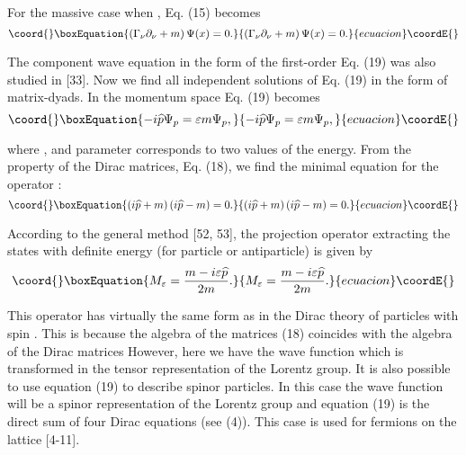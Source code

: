 \documentclass[a4paper,12pt]{article}
\begin{document}
For the massive case when \coordHE{}, Eq. (15) becomes
\begin{equation}\coord{}\boxEquation{
\left( \Gamma _\nu \partial _\nu +m\right) \Psi (x)=0 .\label{19}
}{
\left( \Gamma _\nu \partial _\nu +m\right) \Psi (x)=0 .}{ecuacion}\coordE{}\end{equation}

The \coordHE{}component wave equation in the form of the first-order Eq. (19) was
also studied in [33]. Now we find all independent solutions of Eq. (19) in
the form of matrix-dyads. In the momentum space Eq. (19) becomes
\begin{equation}\coord{}\boxEquation{
-i\widehat{p}\Psi _p=\varepsilon m\Psi _p , \label{20}
}{
-i\widehat{p}\Psi _p=\varepsilon m\Psi _p , }{ecuacion}\coordE{}\end{equation}

where \coordHE{}, and parameter \coordHE{} corresponds to two values of the energy. From the property
of the Dirac matrices, Eq. (18), we find the minimal equation for
the operator \coordHE{}:
\begin{equation}\coord{}\boxEquation{
\left( i\widehat{p}+m\right) \left( i\widehat{p}-m\right) =0 .
\label{21}
}{
\left( i\widehat{p}+m\right) \left( i\widehat{p}-m\right) =0 .
}{ecuacion}\coordE{}\end{equation}

According to the general method [52, 53], the projection operator
extracting the states with definite energy (for particle or
antiparticle) is given by
\begin{equation}\coord{}\boxEquation{
M_\varepsilon =\frac{m-i\varepsilon \widehat{p}}{2m} . \label{22}
}{
M_\varepsilon =\frac{m-i\varepsilon \widehat{p}}{2m} . }{ecuacion}\coordE{}\end{equation}

This operator has virtually the same form as in the Dirac theory of
particles with spin \coordHE{}. This is because the algebra of the matrices (18)
coincides with the algebra of the Dirac matrices \coordHE{} However,
here we have the wave function \coordHE{} which is transformed in the tensor
representation of the Lorentz group. It is also possible to use equation
(19) to describe spinor particles. In this case the wave function \coordHE{}
will be a spinor representation of the Lorentz group and equation (19) is
the direct sum of four Dirac equations (see (4)). This case is used for
fermions on the lattice [4-11].
\end{document}
